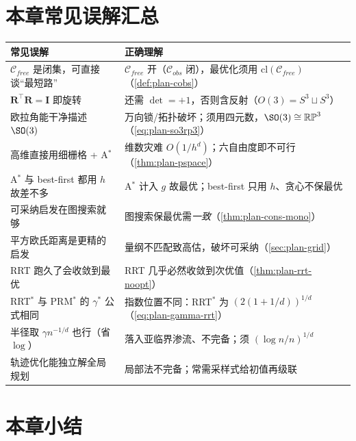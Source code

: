 \section*{本章常见误解汇总}
\begin{table}[H]\centering\small
\begin{tabular}{p{} p{}}
\toprule
\textbf{常见误解} & \textbf{正确理解} \\
\midrule
$\mathcal{C}_{free}$ 是闭集，可直接谈“最短路” & $\mathcal{C}_{free}$ 开（$\mathcal{C}_{obs}$ 闭），最优化须用 $\mathrm{cl}(\mathcal{C}_{free})$（\cref{def:plan-cobs}）\\
$\mathbf{R}^\top\mathbf{R}=\mathbf{I}$ 即旋转 & 还需 $\det=+1$，否则含反射（$O(3)=S^3\sqcup S^3$）\\
欧拉角能干净描述 $\SO(3)$ & 万向锁/拓扑破坏；须用四元数，$\SO(3)\cong\mathbb{RP}^3$（\cref{eq:plan-so3rp3}）\\
高维直接用细栅格 + A$^*$ & 维数灾难 $O(1/h^d)$；六自由度即不可行（\cref{thm:plan-pspace}）\\
A$^*$ 与 best-first 都用 $h$ 故差不多 & A$^*$ 计入 $g$ 故最优；best-first 只用 $h$、贪心不保最优 \\
可采纳启发在图搜索就够 & 图搜索保最优需\emph{一致}（\cref{thm:plan-cons-mono}）\\
平方欧氏距离是更精的启发 & 量纲不匹配致高估，破坏可采纳（\cref{sec:plan-grid}）\\
RRT 跑久了会收敛到最优 & RRT 几乎必然收敛到次优值（\cref{thm:plan-rrt-noopt}）\\
RRT$^*$ 与 PRM$^*$ 的 $\gamma^*$ 公式相同 & 指数位置不同：RRT$^*$ 为 $(2(1+1/d))^{1/d}$（\cref{eq:plan-gamma-rrt}）\\
半径取 $\gamma n^{-1/d}$ 也行（省 $\log$） & 落入亚临界渗流、不完备；须 $(\log n/n)^{1/d}$ \\
轨迹优化能独立解全局规划 & 局部法不完备；常需采样式给初值再级联 \\
\bottomrule
\end{tabular}
\end{table}

\section*{本章小结}

